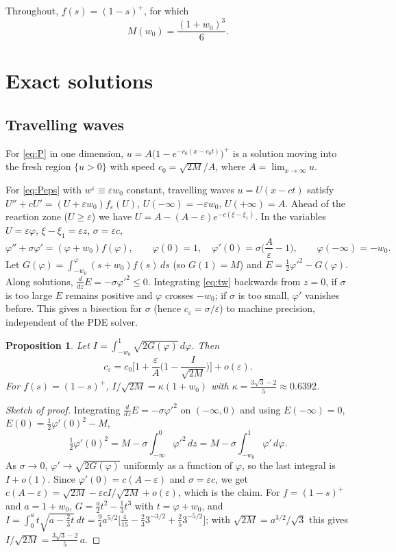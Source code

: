 \documentclass[11pt]{amsart}
\newtheorem{proposition}[theorem]{Proposition}
\theoremstyle{remark}
\newcommand{\ve}{\varepsilon}
\begin{document}
Throughout, $f(s)=(1-s)^+$, for which
\begin{equation}\label{eq:M}
M(w_0)=\frac{(1+w_0)^3}{6}.
\end{equation}

\section{Exact solutions}\label{sec:exact}

\subsection{Travelling waves}
For \eqref{eq:P} in one dimension, $u=A\big(1-e^{-c_0(x-c_0t)}\big)^+$ is a
solution moving into the fresh region $\{u>0\}$ with speed
$c_0=\sqrt{2M}/A$, where $A=\lim_{x\to\infty}u$.

For \eqref{eq:Peps} with $w^\ve\equiv\ve w_0$ constant, travelling waves
$u=U(x-ct)$ satisfy $U''+cU'=(U+\ve w_0)f_\ve(U)$, $U(-\infty)=-\ve w_0$,
$U(+\infty)=A$. Ahead of the reaction zone ($U\ge\ve$) we have
$U=A-(A-\ve)e^{-c(\xi-\xi_1)}$. In the variables $U=\ve\varphi$,
$\xi-\xi_1=\ve z$, $\sigma=\ve c$,
\begin{equation}\label{eq:tw}
\varphi''+\sigma\varphi'=(\varphi+w_0)f(\varphi),\qquad
\varphi(0)=1,\quad \varphi'(0)=\sigma\Big(\frac A\ve-1\Big),\qquad \varphi(-\infty)=-w_0.
\end{equation}
Let $G(\varphi)=\int_{-w_0}^{\varphi}(s+w_0)f(s)\,ds$ (so $G(1)=M$) and
$E=\tfrac12\varphi'^2-G(\varphi)$. Along solutions,
$\frac{d}{dz}E=-\sigma\varphi'^2\le0$. Integrating \eqref{eq:tw} backwards from
$z=0$, if $\sigma$ is too large $E$ remains positive and $\varphi$ crosses
$-w_0$; if $\sigma$ is too small, $\varphi'$ vanishes before. This gives a
bisection for $\sigma$ (hence $c_\ve=\sigma/\ve$) to machine precision,
independent of the PDE solver.

\begin{proposition}\label{prop:speed}
Let $I=\int_{-w_0}^1\sqrt{2G(\varphi)}\,d\varphi$. Then
\[
c_\ve=c_0\Big[1+\frac\ve A\Big(1-\frac{I}{\sqrt{2M}}\Big)\Big]+o(\ve).
\]
For $f(s)=(1-s)^+$, $I/\sqrt{2M}=\kappa(1+w_0)$ with
$\kappa=\frac{3\sqrt3-2}{5}\approx0.6392$.
\end{proposition}

\begin{proof}[Sketch of proof]
Integrating $\frac{d}{dz}E=-\sigma\varphi'^2$ on $(-\infty,0)$ and using
$E(-\infty)=0$, $E(0)=\frac12\varphi'(0)^2-M$,
\[
\tfrac12\varphi'(0)^2=M-\sigma\int_{-\infty}^0\varphi'^2\,dz
=M-\sigma\int_{-w_0}^{1}\varphi'\,d\varphi .
\]
As $\sigma\to0$, $\varphi'\to\sqrt{2G(\varphi)}$ uniformly as a function of
$\varphi$, so the last integral is $I+o(1)$. Since
$\varphi'(0)=c(A-\ve)$ and $\sigma=\ve c$, we get
$c(A-\ve)=\sqrt{2M}-\ve cI/\sqrt{2M}+o(\ve)$, which is the claim. For
$f=(1-s)^+$ and $a=1+w_0$, $G=\frac a2t^2-\frac13t^3$ with $t=\varphi+w_0$, and
$I=\int_0^at\sqrt{a-\tfrac23t}\,dt=\tfrac94a^{5/2}\big[\tfrac4{15}-\tfrac23 3^{-3/2}+\tfrac25 3^{-5/2}\big]$;
with $\sqrt{2M}=a^{3/2}/\sqrt3$ this gives $I/\sqrt{2M}=\frac{3\sqrt3-2}5\,a$.
\end{proof}
\end{document}
